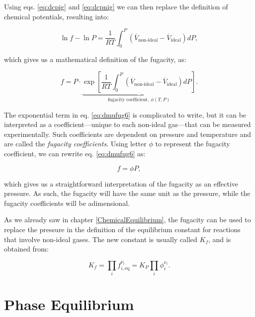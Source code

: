\documentclass[
  9pt,
]{extbook}
\theoremstyle{definition}
\theoremstyle{definition}
\theoremstyle{definition}
\theoremstyle{remark}
\begin{document}
Using eqs. \eqref{eq:dcpig} and \eqref{eq:dcpnig} we can then replace the definition of chemical potentials, resulting into:

\begin{equation}
\ln f - \ln P = \frac{1}{RT} \int_0^P \left(\overline{V}_{\text{non-ideal}} - \overline{V}_{\text{ideal}} \right) dP,
\label{eq:dmufug5}
\end{equation}

which gives us a mathematical definition of the fugacity, as:

\begin{equation}
f = P \cdot \underbrace{\exp\left[ \frac{1}{RT} \int_0^P \left(\overline{V}_{\text{non-ideal}}-\overline{V}_{\text{ideal}} \right) dP \right]}_{\text{fugacity coefficient, }\phi(T,P)}.
\label{eq:dmufug6}
\end{equation}

The exponential term in eq. \eqref{eq:dmufug6} is complicated to write, but it can be interpreted as a coefficient---unique to each non-ideal gas---that can be measured experimentally. Such coefficients are dependent on pressure and temperature and are called the \emph{fugacity coefficients}. Using letter \(\phi\) to represent the fugacity coefficient, we can rewrite eq. \eqref{eq:dmufug6} as:

\begin{equation}
f = \phi P,
\label{eq:dmufug7}
\end{equation}

which gives us a straightforward interpretation of the fugacity as an effective pressure. As such, the fugacity will have the same unit as the pressure, while the fugacity coefficients will be adimensional.

As we already saw in chapter \ref{ChemicalEquilibrium}, the fugacity can be used to replace the pressure in the definition of the equilibrium constant for reactions that involve non-ideal gases. The new constant is usually called \(K_f\), and is obtained from:

\begin{equation}
K_f=\prod_i f_{i,\text{eq}}^{\nu_i} = K_P \prod_i \phi_{i}^{\nu_i}.
\label{eq:kfdef}
\end{equation}

\renewcommand*{\standardstate}{{-\kern-6pt{\ominus}\kern-6pt-}}

\hypertarget{PhaseEquilibrium}{%
\chapter{Phase Equilibrium}\label{PhaseEquilibrium}}
\end{document}
